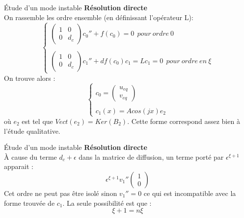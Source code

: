 \documentclass{beamer}
\begin{document}
\begin{frame}{\'Etude d'un mode instable}
\textbf{Résolution directe}\\
On rassemble les ordre ensemble (en définissant l'opérateur L): 
\begin{equation}
\left\{
    \begin{array}{ll}
        \begin{pmatrix}
        1 & 0\\
        0 & d_c
        \end{pmatrix} c_0'' + f(c_0) = 0\ \   pour\ ordre\ 0
        \\
        \\
        \begin{pmatrix}
        1 & 0\\
        0 & d_c
        \end{pmatrix} c_1'' + df(c_0)c_1=Lc_1=0\ \   pour\ ordre\ en\ \xi
    \end{array}
\right.
\end{equation}
On trouve alors :
\begin{equation}
\left\{
    \begin{array}{ll}
        c_0 = \begin{pmatrix} u_{eq} \\ v_{eq} \end{pmatrix}
        \\
        \\
        c_1(x) = A cos(jx)e_2
    \end{array}
\right.
\end{equation}
où $e_2$ est tel que $Vect(e_2)=Ker(B_2)$. Cette forme correspond assez bien à l'étude qualitative. 
\end{frame}

\begin{frame}{\'Etude d'un mode instable}
\textbf{Résolution directe}\\
À cause du terme $d_c + \epsilon$ dans la matrice de diffusion, un terme porté par $\epsilon^{\xi +1}$ apparait : 
\begin{equation}
\epsilon^{\xi +1} v_1 ''   \begin{pmatrix}
        1 \\
        0 
        \end{pmatrix} 
\end{equation}
Cet ordre ne peut pas être isolé sinon $v_1 ''=0$ ce qui est incompatible avec la forme trouvée de $c_1$. La seule possibilité est que : 
\begin{equation}
    \xi+1=n\xi
\end{equation}
\end{frame}
\end{document}
